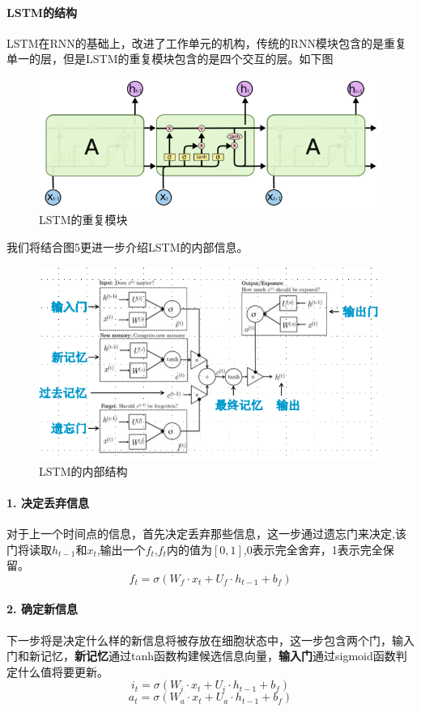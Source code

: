 \documentclass[UTF8]{ctexart}
\begin{document}
\paragraph*{LSTM的结构}
LSTM在RNN的基础上，改进了工作单元的机构，传统的RNN模块包含的是重复单一的层，但是LSTM的重复模块包含的是四个交互的层。如下图
\begin{figure}[!htbp]
    \centering
    \includegraphics[scale = 0.8]{p4.png}
    \caption{LSTM的重复模块\cite{1}}
\end{figure}
我们将结合图5更进一步介绍LSTM的内部信息。
\begin{figure}[!htbp]
    \centering
    \includegraphics[scale = 0.8]{p5.png}
    \caption{LSTM的内部结构\cite{2}}
\end{figure}
\paragraph*{1. 决定丢弃信息}对于上一个时间点的信息，首先决定丢弃那些信息，这一步通过遗忘门来决定,该门将读取$h_{t-1}$和$x_t$,输出一个$f_t$,$f_t$内的值为$[0,1]$,0表示完全舍弃，1表示完全保留。
$$f_t = \sigma(W_f\cdot x_t + U_f\cdot h_{t-1} + b_f)$$
\paragraph*{2. 确定新信息}
下一步将是决定什么样的新信息将被存放在细胞状态中，这一步包含两个门，输入门和新记忆，\textbf{新记忆}通过tanh函数构建候选信息向量，\textbf{输入门}通过sigmoid函数判定什么值将要更新。
$$i_t = \sigma(W_i\cdot x_t + U_i\cdot h_{t-1} + b_f)$$
$$a_t = \sigma(W_a\cdot x_t + U_a\cdot h_{t-1} + b_f)$$
\end{document}
